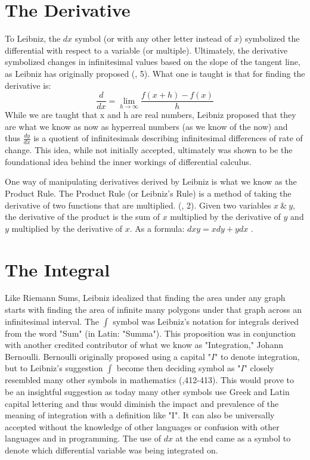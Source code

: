 \documentclass[12pt]{report}
\begin{document}
    \section*{The Derivative}
To Leibniz, the $dx$ symbol (or with any other letter instead of $x$) symbolized the differential with respect to a variable (or multiple).
Ultimately, the derivative symbolized changes in infinitesimal values based on the slope of the tangent line, as Leibniz has originally proposed (, 5).
What one is taught is that for finding the derivative is: \[\frac{d}{dx} = \lim_{h \xrightarrow{} \infty} \frac{f(x+h)-f(x)}{h}\] While we are taught that x and h are real numbers, Leibniz proposed that they are what we know as now as hyperreal numbers (as we know of the now) and thus $\frac{dy}{dx}$  is a quotient of infinitesimals describing infinitesimal differences of rate of change.
This idea, while not initially accepted, ultimately was shown to be the foundational idea behind the inner workings of differential calculus.\\ \par
    One way of manipulating derivatives derived by Leibniz is what we know as the Product Rule.
The Product Rule (or Leibniz's Rule) is a method of taking the derivative of two functions that are multiplied. (, 2).
Given two variables $x \ \& \  y$, the derivative of the product is the sum of $x$ multiplied by the derivative of $y$ and $y$ multiplied by the derivative of $x$. As a formula:  $dxy=xdy+ydx$ .

    \section*{The Integral}
Like Riemann Sums, Leibniz idealized that finding the area under any graph starts with finding the area of infinite many polygons under that graph across an infinitesimal interval. 
The $\int$ symbol was Leibniz's notation for integrals derived from the word "Sum" (in Latin: "Summa"). 
This proposition was in conjunction with another credited contributor of what we know as "Integration," Johann Bernoulli. 
Bernoulli originally proposed using a capital "$I$" to denote integration, but to Leibniz's suggestion $\int$ become then deciding symbol as "$I$" closely resembled many other symbols in mathematics (,412-413).
This would prove to be an insightful suggestion as today many other symbols use Greek and Latin capital lettering and thus would diminish the impact and prevalence of the meaning of integration with a definition like "I". It can also be universally accepted without the knowledge of other languages or confusion with other languages and in programming.  
The use of $dx$ at the end came as a symbol to denote which differential variable was being integrated on.
    
\end{document}
